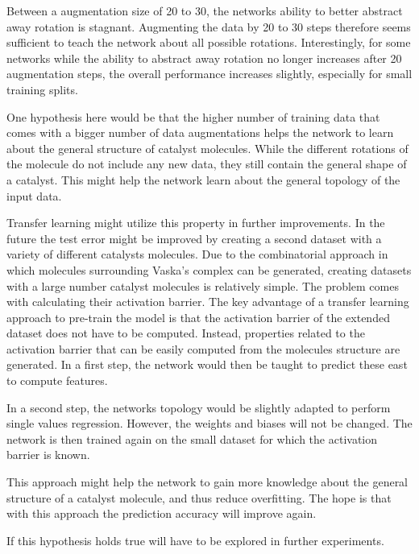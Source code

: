 Between a augmentation size of 20 to 30, the networks ability to better abstract away rotation is stagnant.
Augmenting the data by 20 to 30 steps therefore seems sufficient to teach the network about all possible rotations.
Interestingly, for some networks while the ability to abstract away rotation no longer increases after 20 augmentation 
steps, the overall performance increases slightly, especially for small training splits.

One hypothesis here would be that the higher number of training data that comes with a bigger number of data augmentations
helps the network to learn about the general structure of catalyst molecules.
While the different rotations of the molecule do not include any new data, they still contain the 
general shape of a catalyst.
This might help the network learn about the general topology of the input data.

Transfer learning might utilize this property in further improvements.
In the future the test error might be improved by creating a second dataset with a variety of different catalysts molecules.
Due to the combinatorial approach in which molecules surrounding Vaska's complex can be generated, 
creating datasets with a large number catalyst molecules is relatively simple.
The problem comes with calculating their activation barrier.
The key advantage of a transfer learning approach to pre-train the model is that the activation barrier of the extended dataset does not have to be computed.
Instead, properties related to the activation barrier that can be easily computed from the molecules structure are generated.
In a first step, the network would then be taught to predict these east to compute features.

In a second step, the networks topology would be slightly adapted to perform single values regression.
However, the weights and biases will not be changed.
The network is then trained again on the small dataset for which the activation barrier is known.

This approach might help the network to gain more knowledge about the general structure of a catalyst molecule,
and thus reduce overfitting.
The hope is that with this approach the prediction accuracy will improve again.

If this hypothesis holds true will have to be explored in further experiments.


